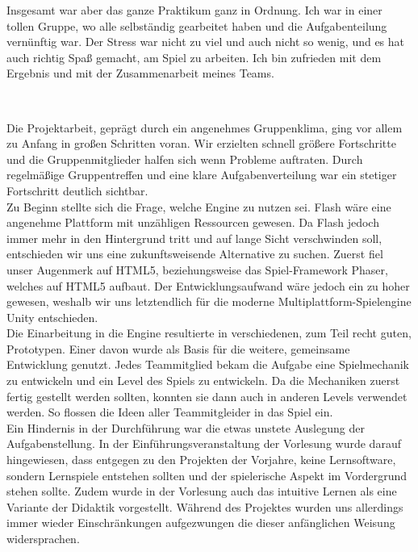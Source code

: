 \documentclass[10pt,a4paper,notitlepage]{report}
\begin{document}
	\clearpage
	\marginpar{\vspace{3.0mm} \color{orange}\rule{0.8mm}{53.3mm} \\[3mm] \color{hellorange}\rule{0.8mm}{170mm}}
	\par\bigskip
	
	Insgesamt war aber das ganze Praktikum ganz in Ordnung. Ich war in einer tollen Gruppe, wo alle selbständig gearbeitet haben und die Aufgabenteilung vernünftig war. Der Stress war nicht zu viel und auch nicht so wenig, und es hat auch richtig Spaß gemacht, am Spiel zu arbeiten. Ich bin zufrieden mit dem Ergebnis und mit der Zusammenarbeit meines Teams.\\\par\smallskip

	\\\par\medskip\Text
	Die Projektarbeit, geprägt durch ein angenehmes Gruppenklima, ging vor allem zu Anfang in großen Schritten voran. Wir erzielten schnell größere Fortschritte und die Gruppenmitglieder halfen sich wenn Probleme auftraten. Durch regelmäßige Gruppentreffen und eine klare Aufgabenverteilung war ein stetiger Fortschritt deutlich sichtbar.\\
	Zu Beginn stellte sich die Frage, welche Engine zu nutzen sei. Flash wäre eine angenehme Plattform mit unzähligen Ressourcen gewesen. Da Flash jedoch immer mehr in den Hintergrund tritt und auf lange Sicht verschwinden soll, entschieden wir uns eine zukunftsweisende Alternative zu suchen. Zuerst fiel unser Augenmerk auf HTML5, beziehungsweise das Spiel-Framework Phaser, welches auf HTML5 aufbaut. Der Entwicklungsaufwand wäre jedoch ein zu hoher gewesen, weshalb wir uns letztendlich für die moderne Multiplattform-Spielengine Unity entschieden.\\
	Die Einarbeitung in die Engine resultierte in verschiedenen, zum Teil recht guten, Prototypen. Einer davon wurde als Basis für die weitere, gemeinsame Entwicklung genutzt. Jedes Teammitglied bekam die Aufgabe eine Spielmechanik zu entwickeln und ein Level des Spiels zu entwickeln. Da die Mechaniken zuerst fertig gestellt werden sollten, konnten sie dann auch in anderen Levels verwendet werden. So flossen die Ideen aller Teammitgleider in das Spiel ein.\\
	Ein Hindernis in der Durchführung war die etwas unstete Auslegung der Aufgabenstellung. In der Einführungsveranstaltung der Vorlesung wurde darauf hingewiesen, dass entgegen zu den Projekten der Vorjahre, keine Lernsoftware, sondern Lernspiele entstehen sollten und der spielerische Aspekt im Vordergrund stehen sollte. Zudem wurde in der Vorlesung auch das intuitive Lernen als eine Variante der Didaktik vorgestellt. Während des Projektes wurden uns allerdings immer wieder Einschränkungen aufgezwungen die dieser anfänglichen Weisung widersprachen.\\
\end{document}
